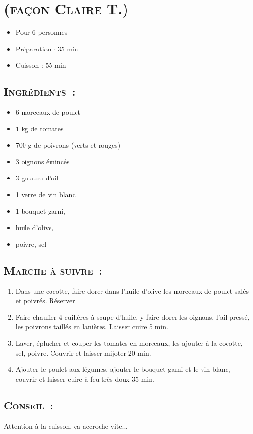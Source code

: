 \section[\normalsize{Poulet basquaise (fa\c con Claire T.)}]{\LARGE{\textsc{(fa\c con Claire T.)}}}		%


\begin{itemize}
\item Pour 6 personnes
\item Préparation : 35 min
\item Cuisson : 55 min
\end{itemize}

\subsection*{\textsc{Ingr\'edients~:}}

\begin{itemize}
\item 6 morceaux de poulet 
\item 1 kg de tomates 
\item 700 g de poivrons (verts et rouges) 
\item 3 oignons \'eminc\'es 
\item 3 gousses d'ail 
\item 1 verre de vin blanc
\item 1 bouquet garni, 
\item huile d'olive, 
\item poivre, sel
\end{itemize}


\subsection*{\textsc{Marche \`a suivre~:}}

\begin{enumerate}
\item Dans une cocotte, faire dorer dans l'huile d'olive les morceaux de poulet sal\'es et poivr\'es. R\'eserver.
\item Faire chauffer 4 cuill\`eres \`a soupe d'huile, y faire dorer les oignons, l'ail press\'e, les poivrons taill\'es en lani\`eres. Laisser cuire 5 min.
\item Laver, \'eplucher et couper les tomates en morceaux, les ajouter \`a la cocotte, sel, poivre. Couvrir et laisser mijoter 20 min.
\item Ajouter le poulet aux l\'egumes, ajouter le bouquet garni et le vin blanc, couvrir et laisser cuire \`a feu tr\`es doux 35 min. 
\end{enumerate}
\subsection*{\textsc{Conseil~:}}
Attention \`a la cuisson, ça accroche vite...
